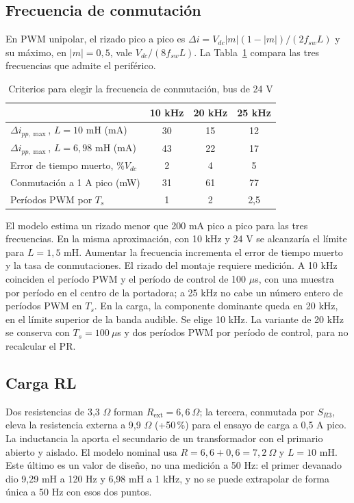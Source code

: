 \documentclass[conference]{IEEEtran}
\begin{document}
\subsection{Frecuencia de conmutación}
\label{sec:fsw}
En PWM unipolar, el rizado pico a pico es $\Delta i=V_{dc}|m|(1-|m|)/(2f_{sw}L)$ y su máximo, en $|m|=0{,}5$, vale $V_{dc}/(8f_{sw}L)$. La Tabla~\ref{tab:fsw} compara las tres frecuencias que admite el periférico.

\begin{table}[H]\caption{Criterios para elegir la frecuencia de conmutación, bus de 24 V}\centering\small
\begin{tabular}{@{}lccc@{}}\toprule
 & 10 kHz & 20 kHz & 25 kHz\\\midrule
$\Delta i_{pp,\max}$, $L=10$ mH (mA) & 30 & 15 & 12\\
$\Delta i_{pp,\max}$, $L=6{,}98$ mH (mA) & 43 & 22 & 17\\
Error de tiempo muerto, $\%V_{dc}$ & 2 & 4 & 5\\
Conmutación a 1 A pico (mW) & 31 & 61 & 77\\
Períodos PWM por $T_s$ & 1 & 2 & 2,5\\\bottomrule
\end{tabular}\label{tab:fsw}\end{table}

El modelo estima un rizado menor que 200 mA pico a pico para las tres frecuencias. En la misma aproximación, con 10 kHz y 24 V se alcanzaría el límite para $L=1{,}5$ mH. Aumentar la frecuencia incrementa el error de tiempo muerto y la tasa de conmutaciones. El rizado del montaje requiere medición. A 10 kHz coinciden el período PWM y el período de control de 100 $\mu$s, con una muestra por período en el centro de la portadora; a 25 kHz no cabe un número entero de períodos PWM en $T_s$. En la carga, la componente dominante queda en 20 kHz, en el límite superior de la banda audible. Se elige 10 kHz. La variante de 20 kHz se conserva con $T_s=100\ \mu$s y dos períodos PWM por período de control, para no recalcular el PR.

\subsection{Carga RL}
\label{sec:carga}
Dos resistencias de 3,3 $\Omega$ forman $R_{\mathrm{ext}}=6{,}6\ \Omega$; la tercera, conmutada por $S_{R3}$, eleva la resistencia externa a 9,9 $\Omega$ (+50\,\%) para el ensayo de carga a 0,5 A pico. La inductancia la aporta el secundario de un transformador con el primario abierto y aislado. El modelo nominal usa $R=6{,}6+0{,}6=7{,}2\ \Omega$ y $L=10$ mH. Este último es un valor de diseño, no una medición a 50 Hz: el primer devanado dio 9,29 mH a 120 Hz y 6,98 mH a 1 kHz, y no se puede extrapolar de forma única a 50 Hz con esos dos puntos.
\end{document}
